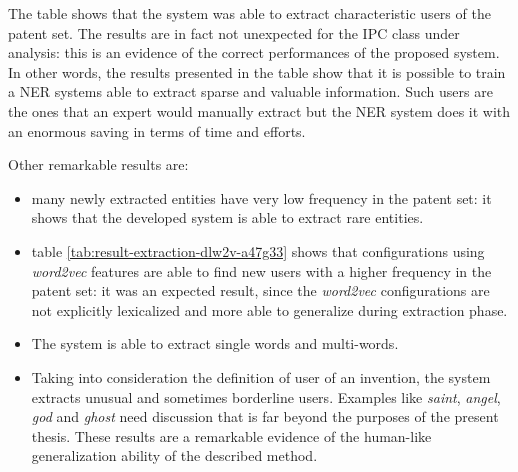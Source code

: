 \documentclass[b5paper,]{book}
\theoremstyle{definition}
\theoremstyle{definition}
\theoremstyle{definition}
\theoremstyle{remark}
\begin{document}
The table shows that the system was able to extract characteristic users
of the patent set. The results are in fact not unexpected for the IPC
class under analysis: this is an evidence of the correct performances of
the proposed system. In other words, the results presented in the table
show that it is possible to train a NER systems able to extract sparse
and valuable information. Such users are the ones that an expert would
manually extract but the NER system does it with an enormous saving in
terms of time and efforts.

Other remarkable results are:

\begin{itemize}
\item
  many newly extracted entities have very low frequency in the patent
  set: it shows that the developed system is able to extract rare
  entities.
\item
  table \ref{tab:result-extraction-dlw2v-a47g33} shows that
  configurations using \emph{word2vec} features are able to find new
  users with a higher frequency in the patent set: it was an expected
  result, since the \emph{word2vec} configurations are not explicitly
  lexicalized and more able to generalize during extraction phase.
\item
  The system is able to extract single words and multi-words.
\item
  Taking into consideration the definition of user of an invention, the
  system extracts unusual and sometimes borderline users. Examples like
  \emph{saint}, \emph{angel}, \emph{god} and \emph{ghost} need
  discussion that is far beyond the purposes of the present thesis.
  These results are a remarkable evidence of the human-like
  generalization ability of the described method.
\end{itemize}
\end{document}

